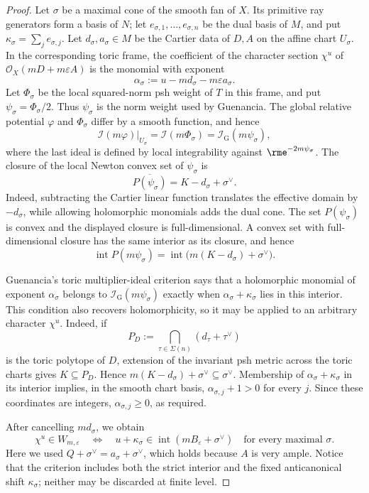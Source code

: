 \begin{proof}
Let \(\sigma\) be a maximal cone of the smooth fan of \(X\).  Its primitive
ray generators form a basis of \(N\); let
\(e_{\sigma,1},\ldots,e_{\sigma,n}\) be the dual basis of \(M\), and put
\(\kappa_\sigma=\sum_j e_{\sigma,j}\).  Let
\(d_\sigma,a_\sigma\in M\) be the Cartier data of \(D,A\) on the affine chart
\(U_\sigma\).  In the corresponding toric frame, the coefficient of the
character section \(\chi^u\) of
\(\mathcal O_X(mD+m\varepsilon A)\) is the monomial with exponent
\[
       \alpha_\sigma:=u-m d_\sigma-m\varepsilon a_\sigma.
\]
Let \(\Phi_\sigma\) be the local squared-norm psh weight of \(T\) in this
frame, and put \(\psi_\sigma=\Phi_\sigma/2\).  Thus \(\psi_\sigma\) is the
norm weight used by Guenancia.  The global relative potential \(\varphi\)
and \(\Phi_\sigma\) differ by a smooth function, and hence
\[
 \mathcal I(m\varphi)|_{U_\sigma}
   =\mathcal I(m\Phi_\sigma)
   =\mathcal I_{\mathrm G}(m\psi_\sigma),
\]
where the last ideal is defined by local integrability against
\(\rme^{-2m\psi_\sigma}\).  The closure of the local Newton convex set of
\(\psi_\sigma\) is
\[
              \overline{P(\psi_\sigma)}
                    =K-d_\sigma+\sigma^\vee.
\]
Indeed, subtracting the Cartier linear function translates the effective
domain by \(-d_\sigma\), while allowing holomorphic monomials adds the dual
cone.  The set \(P(\psi_\sigma)\) is convex and the displayed closure is
full-dimensional.  A convex set with full-dimensional closure has the same
interior as its closure, and hence
\[
 \operatorname{int}P(m\psi_\sigma)
   =\operatorname{int}\bigl(m(K-d_\sigma)+\sigma^\vee\bigr).
\]

Guenancia's toric multiplier-ideal criterion
\cite[Theorem~1.13]{Guenancia12} says that a holomorphic monomial of exponent
\(\alpha_\sigma\) belongs to \(\mathcal I_{\mathrm G}(m\psi_\sigma)\)
exactly when \(\alpha_\sigma+\kappa_\sigma\) lies in this interior.  This
condition also recovers holomorphicity, so it may be applied to an arbitrary
character \(\chi^u\).  Indeed, if
\[
 P_D:=\bigcap_{\tau\in\Sigma(n)}(d_\tau+\tau^\vee)
\]
is the toric polytope of \(D\), extension of the invariant psh metric across
the toric charts gives \(K\subseteq P_D\).  Hence
\(m(K-d_\sigma)+\sigma^\vee\subseteq\sigma^\vee\).  Membership of
\(\alpha_\sigma+\kappa_\sigma\) in its interior implies, in the smooth chart
basis, \(\alpha_{\sigma,j}+1>0\) for every \(j\).  Since these coordinates
are integers, \(\alpha_{\sigma,j}\geq0\), as required.

After cancelling \(m d_\sigma\), we obtain
\[
 \chi^u\in W_{m,\varepsilon}
 \quad\Longleftrightarrow\quad
 u+\kappa_\sigma\in
 \operatorname{int}(mB_\varepsilon+\sigma^\vee)
 \quad\text{for every maximal }\sigma.
\]
Here we used
\(Q+\sigma^\vee=a_\sigma+\sigma^\vee\), which holds because \(A\) is
very ample.  Notice that the criterion includes both the strict interior and
the fixed anticanonical shift \(\kappa_\sigma\); neither may be discarded at
finite level.


\end{proof}
